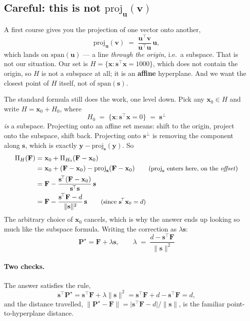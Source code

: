 \documentclass[11pt]{article}
\newcommand{\s}{\mathbf{s}}
\newcommand{\F}{\mathbf{F}}
\newcommand{\Pv}{\mathbf{P}}
\begin{document}
\subsection*{Careful: this is not $\mathrm{proj}_{\mathbf{u}}(\mathbf{v})$}

A first course gives you the projection of one vector onto another,
\[
  \mathrm{proj}_{\mathbf{u}}(\mathbf{v})
  \;=\; \frac{\mathbf{u}^{\!\top}\mathbf{v}}{\mathbf{u}^{\!\top}\mathbf{u}}\,\mathbf{u},
\]
which lands on $\mathrm{span}(\mathbf{u})$ --- a line \emph{through the origin},
i.e.\ a subspace. That is not our situation. Our set is
$H = \{\mathbf{x} : \s^{\!\top}\mathbf{x} = 1000\}$, which does not contain the
origin, so $H$ is not a subspace at all; it is an \textbf{affine} hyperplane. And
we want the closest point of $H$ itself, not of $\mathrm{span}(\s)$.

The standard formula still does the work, one level down. Pick any
$\mathbf{x}_0 \in H$ and write $H = \mathbf{x}_0 + H_0$, where
\[
  H_0 \;=\; \{\mathbf{x} : \s^{\!\top}\mathbf{x} = 0\} \;=\; \s^{\perp}
\]
\emph{is} a subspace. Projecting onto an affine set means: shift to the origin,
project onto the subspace, shift back. Projecting onto $\s^{\perp}$ is removing
the component along $\s$, which is exactly $\mathbf{y} - \mathrm{proj}_{\s}(\mathbf{y})$.
So
\begin{align*}
  \Pi_H(\F)
  &= \mathbf{x}_0 + \Pi_{H_0}\!\left(\F - \mathbf{x}_0\right) \\
  &= \mathbf{x}_0 + (\F - \mathbf{x}_0) - \mathrm{proj}_{\s}(\F - \mathbf{x}_0)
     \qquad \text{\small ($\mathrm{proj}_{\s}$ enters here, on the \emph{offset})} \\
  &= \F - \frac{\s^{\!\top}(\F - \mathbf{x}_0)}{\s^{\!\top}\s}\,\s \\
  &= \F - \frac{\s^{\!\top}\F - d}{\lVert\s\rVert^{2}}\,\s
     \qquad \text{\small (since $\s^{\!\top}\mathbf{x}_0 = d$)}
\end{align*}
The arbitrary choice of $\mathbf{x}_0$ cancels, which is why the answer ends up
looking so much like the subspace formula. Writing the correction as
$\lambda\s$:
\[
  \boxed{\;\Pv^\star = \F + \lambda\s,
  \qquad \lambda \;=\; \frac{d - \s^{\!\top}\F}{\lVert\s\rVert^{2}}\;}
\]

\paragraph{Two checks.} The answer satisfies the rule,
\[
  \s^{\!\top}\Pv^\star = \s^{\!\top}\F + \lambda\lVert\s\rVert^{2}
                       = \s^{\!\top}\F + d - \s^{\!\top}\F = d,
\]
and the distance travelled,
$\lVert \Pv^\star - \F\rVert = \lvert \s^{\!\top}\F - d\rvert / \lVert\s\rVert$,
is the familiar point-to-hyperplane distance.
\end{document}
